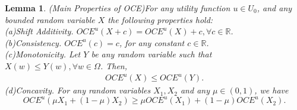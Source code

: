 \documentclass[11pt]{article}
\newtheorem{lemma}{Lemma}
\newcommand{\1}{\mathbbm{1}}
\begin{document}
\begin{lemma}(Main Properties of OCE)\label{L0}
For any utility function $u\in U_0$, and any bounded random variable $X$ the following properties hold:\\
(a)Shift Additivity. $OCE^u(X+c)=OCE^u(X)+c,\forall c\in \mathbb{R}$.\\
(b)Consistency. $OCE^u(c)=c$, for any constant $c\in \mathbb{R}$.\\
(c)Monotonicity. Let $Y$ be any random variable such that $X(w)\leq Y(w),\forall w\in \Omega$. Then,
\begin{align*}
OCE^u(X)\leq OCE^u(Y).
\end{align*}
(d)Concavity. For any random variables $X_1,X_2$ and any $\mu\in (0,1)$, we have
\begin{equation*}
OCE^u(\mu X_1+(1-\mu)X_2)\geq \mu OCE^u(X_1)+(1-\mu)OCE^u(X_2).
\end{equation*} 
\end{lemma}
\end{document}
